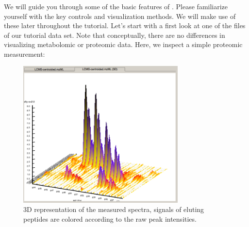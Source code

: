 \noindent We will guide you through some of the basic features of . Please familiarize yourself with the key controls and visualization methods.
We will make use of these later throughout the tutorial. Let's start with a first look at one of the files of our tutorial data set. Note that conceptually, there are no differences in visualizing metabolomic or proteomic data. Here, we inspect a simple proteomic measurement:

\begin{figure}[!htb]
\includegraphics[width=0.75\textwidth]{graphics/introduction/3dview.png}
\caption{3D representation of the measured spectra, signals of eluting peptides are colored according to the raw peak intensities.}
\label{fig:toppview_3D}
\end{figure}


